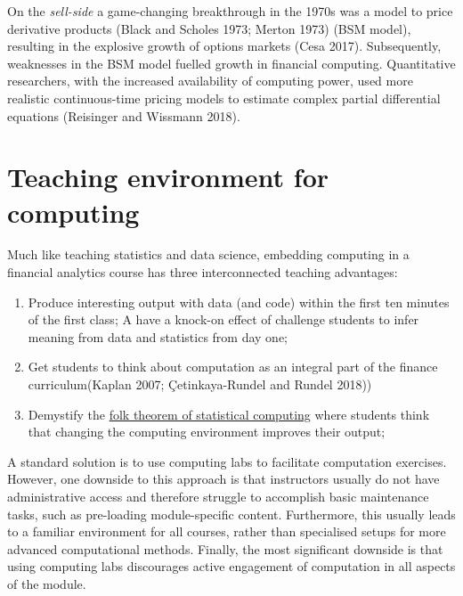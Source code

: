 \documentclass{article}
\begin{document}
On the \emph{sell-side} a game-changing breakthrough in the 1970s was a
model to price derivative products (Black and Scholes 1973; Merton 1973)
(BSM model), resulting in the explosive growth of options markets (Cesa
2017). Subsequently, weaknesses in the BSM model fuelled growth in
financial computing. Quantitative researchers, with the increased
availability of computing power, used more realistic continuous-time
pricing models to estimate complex partial differential equations
(Reisinger and Wissmann 2018).

\hypertarget{teaching-environment-for-computing}{%
\section{Teaching environment for
computing}\label{teaching-environment-for-computing}}

Much like teaching statistics and data science, embedding computing in a
financial analytics course has three interconnected teaching advantages:

\begin{enumerate}
\def\labelenumi{\arabic{enumi}.}
\tightlist
\item
  Produce interesting output with data (and code) within the first ten
  minutes of the first class; A have a knock-on effect of challenge
  students to infer meaning from data and statistics from day one;
\item
  Get students to think about computation as an integral part of the
  finance curriculum(Kaplan 2007; Çetinkaya-Rundel and Rundel 2018))
\item
  Demystify the
  \href{https://statmodeling.stat.columbia.edu/2008/05/13/the_folk_theore/}{folk
  theorem of statistical computing} where students think that changing
  the computing environment improves their output;
\end{enumerate}

A standard solution is to use computing labs to facilitate computation
exercises. However, one downside to this approach is that instructors
usually do not have administrative access and therefore struggle to
accomplish basic maintenance tasks, such as pre-loading module-specific
content. Furthermore, this usually leads to a familiar environment for
all courses, rather than specialised setups for more advanced
computational methods. Finally, the most significant downside is that
using computing labs discourages active engagement of computation in all
aspects of the module.
\end{document}
